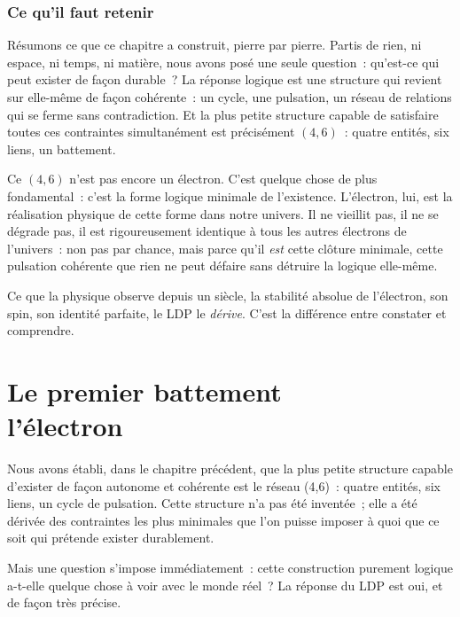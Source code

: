 \documentclass[12pt, a4paper, openright]{book}
\begin{document}
\subsection*{Ce qu'il faut retenir}

Résumons ce que ce chapitre a construit, pierre par pierre. Partis de rien, ni espace, ni temps, ni matière, nous avons posé une seule question~: qu'est-ce qui peut exister de façon durable~? La réponse logique est une structure qui revient sur elle-même de façon cohérente~: un cycle, une pulsation, un réseau de relations qui se ferme sans contradiction. Et la plus petite structure capable de satisfaire toutes ces contraintes simultanément est précisément $(4,6)$~: quatre entités, six liens, un battement.

\medskip

Ce $(4,6)$ n'est pas encore un électron. C'est quelque chose de plus fondamental~: c'est la forme logique minimale de l'existence. L'électron, lui, est la réalisation physique de cette forme dans notre univers. Il ne vieillit pas, il ne se dégrade pas, il est rigoureusement identique à tous les autres électrons de l'univers~: non pas par chance, mais parce qu'il \emph{est} cette clôture minimale, cette pulsation cohérente que rien ne peut défaire sans détruire la logique elle-même.

\medskip

Ce que la physique observe depuis un siècle, la stabilité absolue de l'électron, son spin, son identité parfaite, le LDP le \emph{dérive}. C'est la différence entre constater et comprendre.

\chapter[Le premier battement --- l'électron]{Le premier battement \\ l'électron}

Nous avons établi, dans le chapitre précédent, que la plus petite structure capable d'exister de façon autonome et cohérente est le réseau (4,6)~: quatre entités, six liens, un cycle de pulsation. Cette structure n'a pas été inventée~; elle a été dérivée des contraintes les plus minimales que l'on puisse imposer à quoi que ce soit qui prétende exister durablement.

\medskip

Mais une question s'impose immédiatement~: cette construction purement logique a-t-elle quelque chose à voir avec le monde réel~? La réponse du LDP est oui, et de façon très précise.
\end{document}
